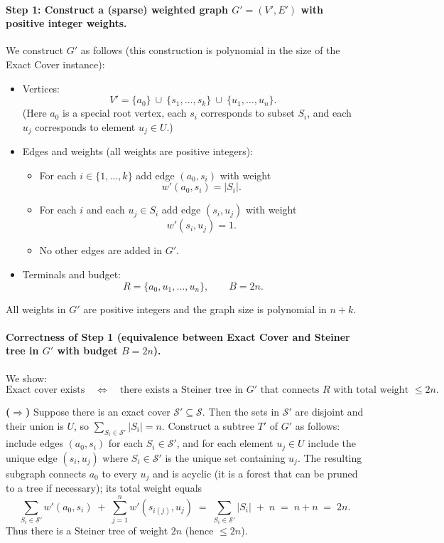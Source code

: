 \documentclass{article}
\begin{document}
\paragraph{Step 1: Construct a (sparse) weighted graph $G'=(V',E')$ with positive integer weights.}
We construct $G'$ as follows (this construction is polynomial in the size of the Exact Cover instance):
\begin{itemize}
    \item Vertices:
    \[
      V'=\{a_0\}\ \cup\ \{s_1,\dots,s_k\}\ \cup\ \{u_1,\dots,u_n\}.
    \]
    (Here $a_0$ is a special root vertex, each $s_i$ corresponds to subset $S_i$, and each $u_j$ corresponds to element $u_j\in U$.)
    \item Edges and weights (all weights are positive integers):
    \begin{itemize}
        \item For each $i\in\{1,\dots,k\}$ add edge $(a_0,s_i)$ with weight
        \[
          w'(a_0,s_i)=|S_i|.
        \]
        \item For each $i$ and each $u_j\in S_i$ add edge $(s_i,u_j)$ with weight
        \[
          w'(s_i,u_j)=1.
        \]
        \item No other edges are added in $G'$.
    \end{itemize}
    \item Terminals and budget:
    \[
      R=\{a_0,u_1,\dots,u_n\},\qquad B=2n.
    \]
\end{itemize}
All weights in $G'$ are positive integers and the graph size is polynomial in $n+k$.

\paragraph{Correctness of Step 1 (equivalence between Exact Cover and Steiner tree in $G'$ with budget $B=2n$).}
We show:
\[
  \text{Exact cover exists} \quad\iff\quad
  \text{there exists a Steiner tree in } G' \text{ that connects } R \text{ with total weight }\le 2n.
\]

\textbf{($\Rightarrow$)} Suppose there is an exact cover $\mathcal S'\subseteq\mathcal S$. Then the sets in $\mathcal S'$ are disjoint and their union is $U$, so $\sum_{S_i\in\mathcal S'}|S_i|=n$. Construct a subtree $T'$ of $G'$ as follows: include edges $(a_0,s_i)$ for each $S_i\in\mathcal S'$, and for each element $u_j\in U$ include the unique edge $(s_i,u_j)$ where $S_i\in\mathcal S'$ is the unique set containing $u_j$. The resulting subgraph connects $a_0$ to every $u_j$ and is acyclic (it is a forest that can be pruned to a tree if necessary); its total weight equals
\[
  \sum_{S_i\in\mathcal S'} w'(a_0,s_i) \;+\; \sum_{j=1}^n w'(s_{i(j)},u_j)
  \;=\;\sum_{S_i\in\mathcal S'} |S_i| \;+\; n \;=\; n + n \;=\; 2n.
\]
Thus there is a Steiner tree of weight $2n$ (hence $\le 2n$).
\end{document}

